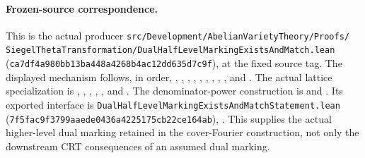 \paragraph{Frozen-source correspondence.}
This is the actual producer
\texttt{src/Development/AbelianVarietyTheory/Proofs/%
SiegelThetaTransformation/DualHalfLevelMarkingExistsAndMatch.lean}
(\texttt{ca7df4a980bb13ba448a4268b4ac12dd635d7c9f}),
at the fixed source tag.
The displayed mechanism follows, in order,
,
, ,
, ,
, ,
, ,
and .
The actual lattice specialization is
, ,
, ,
, and .
The denominator-power construction is
 and .
Its exported interface is
\texttt{DualHalfLevelMarkingExistsAndMatchStatement.lean}
(\texttt{7f5fac9f3799aaede0436a4225175cb22ce164ab}),
.
This supplies the actual higher-level dual marking retained
in the cover-Fourier construction, not only the downstream
CRT consequences of an assumed dual marking.
